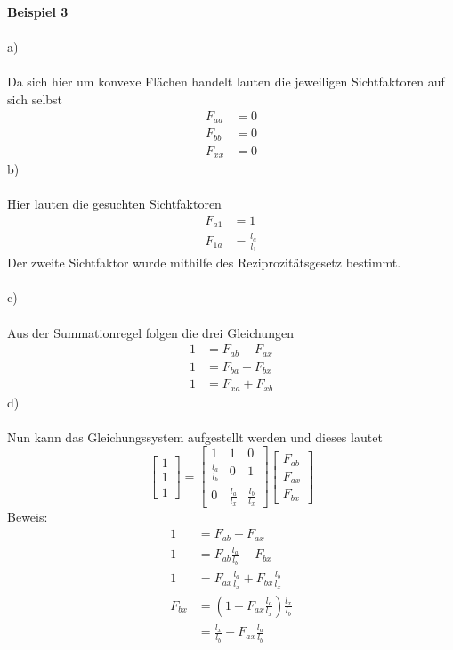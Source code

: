 \textbf{Beispiel 3}\\ \\
a)\\ \\
Da sich hier um konvexe Flächen handelt lauten die jeweiligen Sichtfaktoren auf sich selbst
\begin{align*}
	F_{aa} &= 0 \\
	F_{bb} &= 0 \\
	F_{xx} &= 0
\end{align*}
b) \\ \\
Hier lauten die gesuchten Sichtfaktoren
\begin{align*}
	F_{a1} &= 1 \\
	F_{1a} &= \frac{l_a}{l_1}
\end{align*}
Der zweite Sichtfaktor wurde mithilfe des Reziprozitätsgesetz bestimmt.\\ \\
c) \\ \\
Aus der Summationregel folgen die drei Gleichungen
\begin{align*}
	1 &= F_{ab} + F_{ax} \\
	1 &= F_{ba} + F_{bx} \\
	1 &= F_{xa} + F_{xb}
\end{align*}
\newpage
\noindent
d) \\ \\
Nun kann das Gleichungssystem aufgestellt werden und dieses lautet
\[
	\begin{bmatrix}
		1 \\
		1 \\
		1
	\end{bmatrix}
	=
	\begin{bmatrix}
		1 & 1 & 0 \\
		\frac{l_a}{l_b} & 0 & 1 \\
		0 & \frac{l_a}{l_x} & \frac{l_b}{l_x}
	\end{bmatrix}
	\begin{bmatrix}
		F_{ab} \\
		F_{ax} \\
		F_{bx}
	\end{bmatrix}
\]
Beweis:
\begin{align*}
	1 &= F_{ab} + F_{ax} \\
	1 &= F_{ab}\frac{l_a}{l_b} + F_{bx} \\
	1 &= F_{ax}\frac{l_a}{l_x} + F_{bx}\frac{l_b}{l_x} \\
	F_{bx} &= \left(1 - F_{ax}\frac{l_a}{l_x}\right) \frac{l_x}{l_b} \\
	       &= \frac{l_x}{l_b} - F_{ax}\frac{l_a}{l_b} 
\end{align*}
